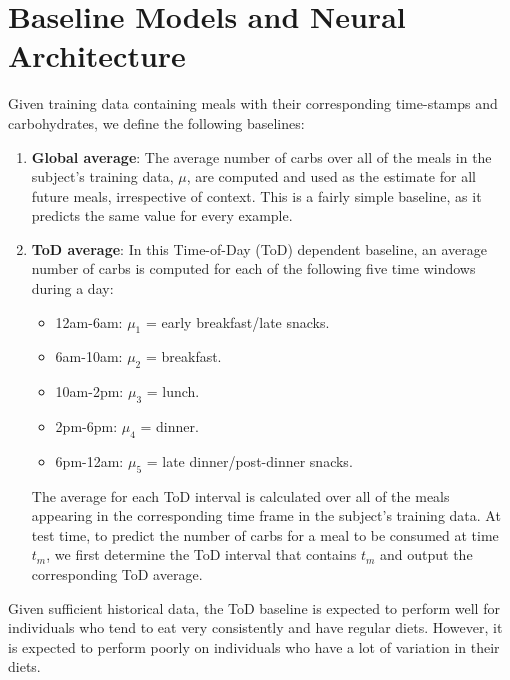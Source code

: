 \documentclass{ecai}
\begin{document}
\section{Baseline Models and Neural Architecture}

Given training data containing meals with their corresponding time-stamps and carbohydrates, we define the following baselines:
\begin{enumerate}
    \item {\bf Global average}: 
    The average number of carbs over all of the meals in the subject's training data, $\mu$, are computed and used as the estimate for all future meals, irrespective of context. This is a fairly simple baseline, as it predicts the same value for every example.
    
    \item {\bf ToD average}: In this Time-of-Day (ToD) dependent baseline, an average number of carbs is computed for each of the following five time windows during a day:
	\begin{itemize}
		\item 12am-6am: $\mu_1$ = early breakfast/late snacks.
		\item 6am-10am: $\mu_2$ = breakfast.
		\item 10am-2pm: $\mu_3$ = lunch.
		\item 2pm-6pm: $\mu_4$ = dinner.
		\item 6pm-12am: $\mu_5$ = late dinner/post-dinner snacks.
	\end{itemize}
    The average for each ToD interval is calculated over all of the meals appearing in the corresponding time frame in the subject's training data. At test time, to predict the number of carbs for a meal to be consumed at time $t_m$, we first determine the ToD interval that contains $t_m$ and output the corresponding ToD average.
\end{enumerate}
Given sufficient historical data, the ToD baseline is expected to perform well for individuals who tend to eat very consistently and have regular diets. However, it is expected to perform poorly on individuals who have a lot of variation in their diets.
\end{document}
